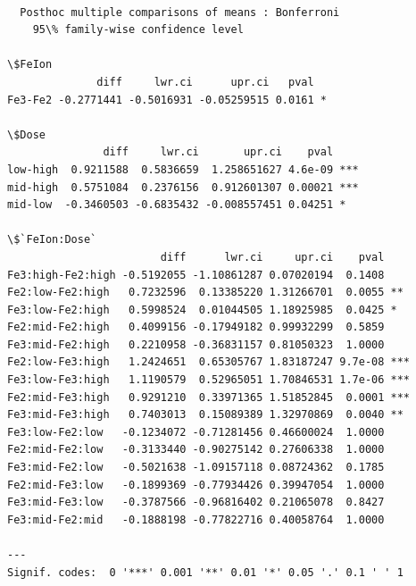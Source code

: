 \documentclass[11pt]{article}
\begin{document}
    
    \begin{Verbatim}[commandchars=\\\{\}]

  Posthoc multiple comparisons of means : Bonferroni 
    95\% family-wise confidence level

\$FeIon
              diff     lwr.ci      upr.ci   pval    
Fe3-Fe2 -0.2771441 -0.5016931 -0.05259515 0.0161 *  

\$Dose
               diff     lwr.ci       upr.ci    pval    
low-high  0.9211588  0.5836659  1.258651627 4.6e-09 ***
mid-high  0.5751084  0.2376156  0.912601307 0.00021 ***
mid-low  -0.3460503 -0.6835432 -0.008557451 0.04251 *  

\$`FeIon:Dose`
                        diff      lwr.ci     upr.ci    pval    
Fe3:high-Fe2:high -0.5192055 -1.10861287 0.07020194  0.1408    
Fe2:low-Fe2:high   0.7232596  0.13385220 1.31266701  0.0055 ** 
Fe3:low-Fe2:high   0.5998524  0.01044505 1.18925985  0.0425 *  
Fe2:mid-Fe2:high   0.4099156 -0.17949182 0.99932299  0.5859    
Fe3:mid-Fe2:high   0.2210958 -0.36831157 0.81050323  1.0000    
Fe2:low-Fe3:high   1.2424651  0.65305767 1.83187247 9.7e-08 ***
Fe3:low-Fe3:high   1.1190579  0.52965051 1.70846531 1.7e-06 ***
Fe2:mid-Fe3:high   0.9291210  0.33971365 1.51852845  0.0001 ***
Fe3:mid-Fe3:high   0.7403013  0.15089389 1.32970869  0.0040 ** 
Fe3:low-Fe2:low   -0.1234072 -0.71281456 0.46600024  1.0000    
Fe2:mid-Fe2:low   -0.3133440 -0.90275142 0.27606338  1.0000    
Fe3:mid-Fe2:low   -0.5021638 -1.09157118 0.08724362  0.1785    
Fe2:mid-Fe3:low   -0.1899369 -0.77934426 0.39947054  1.0000    
Fe3:mid-Fe3:low   -0.3787566 -0.96816402 0.21065078  0.8427    
Fe3:mid-Fe2:mid   -0.1888198 -0.77822716 0.40058764  1.0000    

---
Signif. codes:  0 '***' 0.001 '**' 0.01 '*' 0.05 '.' 0.1 ' ' 1

    \end{Verbatim}



\end{document}
